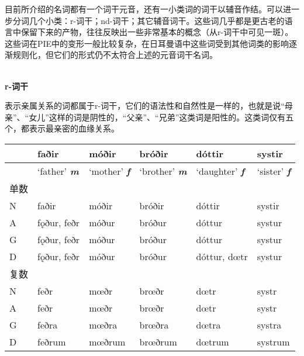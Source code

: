   目前所介绍的名词都有一个词干元音，还有一小类词的词干以辅音作结。可以进一步分词几个小类：r-词干；nd-词干；其它辅音词干。这些词几乎都是更古老的语言中保留下来的产物，往往反映出一些非常基本的概念（从r-词干中可见一斑）。这些词在PIE中的变形一般比较复杂，在日耳曼语中这些词受到其他词类的影响逐渐规则化，但它们的形式仍不太符合上述的元音词干名词。

~\\
\textbf{r-词干}
  
  表示亲属关系的词都属于r-词干，它们的语法性和自然性是一样的，也就是说``母亲''、``女儿''这样的词是阴性的，``父亲''、``兄弟''这类词是阳性的。这类词仅有五个，都表示最亲密的血缘关系。
  
  \begin{longtable}{llllll}
    \toprule
                      & \textbf{faðir} & \textbf{móðir}     & \textbf{bróðir}    & \textbf{dóttir}       & \textbf{systir}  \\
    \midrule
    \endhead
    \bottomrule
    \endfoot
                      & `father' \emph{\textbf{m}}   & `mother' \emph{\textbf{f}} & `brother'
    \emph{\textbf{m}} & `daughter' \emph{\textbf{f}} & `sister'
    \emph{\textbf{f}}                                                                                                  \\
    单数              &                              &                            &           &              &         \\
    N                 & faðir                        & móðir                      & bróðir    & dóttir       & systir  \\
    A                 & fǫður, feðr                  & móður                      & bróður    & dóttur       & systur  \\
    G                 & fǫður, feðr                  & móður                      & bróður    & dóttur       & systur  \\
    D                 & fǫður, feðr                  & móður                      & bróður    & dóttur, dœtr & systur  \\
    复数              &                              &                            &           &              &         \\
    N                 & feðr                         & mœðr                       & brœðr     & dœtr         & systr   \\
    A                 & feðr                         & mœðr                       & brœðr     & dœtr         & systr   \\
    G                 & feðra                        & mœðra                      & brœðra    & dœtra        & systra  \\
    D                 & feðrum                       & mœðrum                     & brœðrum   & dœtrum       & systrum \\
  \end{longtable}
  
